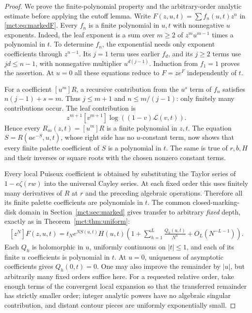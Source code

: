 \documentclass[11pt]{article}
\theoremstyle{definition}
\begin{document}
\begin{proof}
We prove the finite-polynomial property and the arbitrary-order analytic estimate before applying the cutoff lemma. Write $F(z,u,t)=\sum f_n(u,t)z^n$ in \eqref{mct:eq:markedF}. Every $f_n$ is a finite polynomial in $u,t$ with nonnegative $u$ exponents. Indeed, the leaf exponent is a sum over $m\ge2$ of $z^mu^{m-1}$ times a polynomial in $t$. To determine $f_n$, the exponential needs only exponent coefficients through $z^{n-1}$. Its $j=1$ term uses earlier $f_d$, and its $j\ge2$ terms use $jd\le n-1$, with nonnegative multiplier $u^{d(j-1)}$. Induction from $f_1=1$ proves the assertion. At $u=0$ all these equations reduce to $F=ze^F$ independently of $t$.

For a coefficient $[u^m]R$, a recursive contribution from the $u^s$ term of $f_n$ satisfies $n(j-1)+s=m$. Thus $j\le m+1$ and $n\le m/(j-1)$: only finitely many contributions occur. The leaf contribution is
\[
 z^{m+1}[v^{m+1}]\log((1-v)\mathcal L(v,t)).
\]
Hence every $R_m(z,t)=[u^m]R$ is a finite polynomial in $z,t$. The equation $S=R(ae^{-S},u,t)$, whose right side has no $u$-constant term, now shows that every finite palette coefficient of $S$ is a polynomial in $t$. The same is true of $r,b,H$ and their inverses or square roots with the chosen nonzero constant terms.

Every local Puiseux coefficient is obtained by substituting the Taylor series of $1-e\zeta(rw)$ into the universal Cayley series. At each fixed order this uses finitely many derivatives of $R$ at $r$ and the preceding algebraic operations. Therefore all its finite palette coefficients are polynomials in $t$. The common closed-marking-disk domain in Section~\ref{mct:sec:marked} gives transfer to arbitrary \emph{fixed} depth, exactly as in Theorem~\ref{mct:thm:uniform}:
\begin{align}\label{mct:eq:markedalltransfer}
 [z^N]F(z,u,t)=t_Ne^{NS(u,t)}H(u,t)
 \left(1+\sum_{h=1}^L\frac{Q_h(u,t)}{N^h}+O_L(N^{-L-1})\right).
\end{align}
Each $Q_h$ is holomorphic in $u$, uniformly continuous on $|t|\le1$, and each of its finite $u$ coefficients is polynomial in $t$. At $u=0$, uniqueness of asymptotic coefficients gives $Q_h(0,t)=0$. One may also improve the remainder by $|u|$, but arbitrarily many fixed orders suffice here. For a requested relative order, take enough terms of the convergent local expansion so that the transferred remainder has strictly smaller order; integer analytic powers have no algebraic singular contribution, and distant contour pieces are uniformly exponentially small.


\end{proof}
\end{document}
